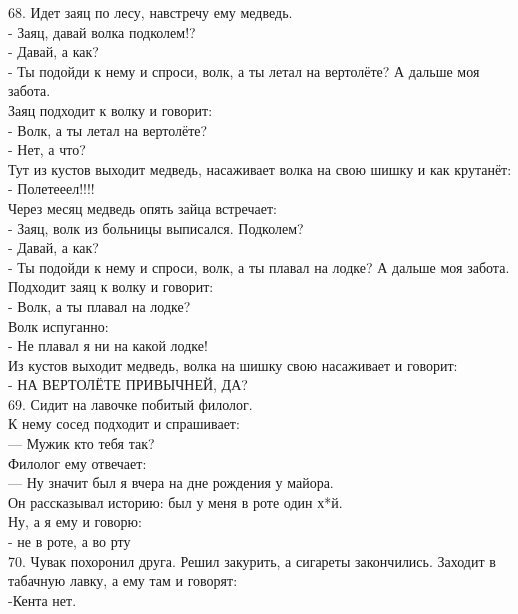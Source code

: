 \documentclass[a4paper,20pt,notitlepage]{extbook}
\begin{document}
	68. Идет заяц по лесу, навстречу ему медведь.\\
	- Заяц, давай волка подколем!?\\
	- Давай, а как?\\
	- Ты подойди к нему и спроси, волк, а ты летал на вертолёте? А дальше моя забота.\\
	Заяц подходит к волку и говорит:\\
	- Волк, а ты летал на вертолёте?\\
	- Нет, а что?\\
	Тут из кустов выходит медведь, насаживает волка на свою шишку и как крутанёт:\\
	- Полетееел!!!!\\
	Через месяц медведь опять зайца встречает:\\
	- Заяц, волк из больницы выписался. Подколем?\\
	- Давай, а как?\\
	- Ты подойди к нему и спроси, волк, а ты плавал на лодке? А дальше моя забота.\\
	Подходит заяц к волку и говорит:\\
	- Волк, а ты плавал на лодке?\\
	Волк испуганно:\\
	- Не плавал я ни на какой лодке!\\
	Из кустов выходит медведь, волка на шишку свою насаживает и говорит:\\
	- НА ВЕРТОЛЁТЕ ПРИВЫЧНЕЙ, ДА?\\
	
	69. Сидит на лавочке побитый филолог. \\
	К нему сосед подходит и спрашивает:\\
	— Мужик кто тебя так?\\
	Филолог ему отвечает:\\
	— Ну значит был я вчера на дне рождения у майора. \\
	Он рассказывал историю: был у меня в роте один х*й.\\
	 Ну, а я ему и говорю:\\
	  - не в роте, а во рту\\
	  
	70. Чувак похоронил друга. Решил закурить, а сигареты закончились. Заходит в табачную лавку, а ему там и говорят:\\ -Кента нет.\\
	
\end{document}
